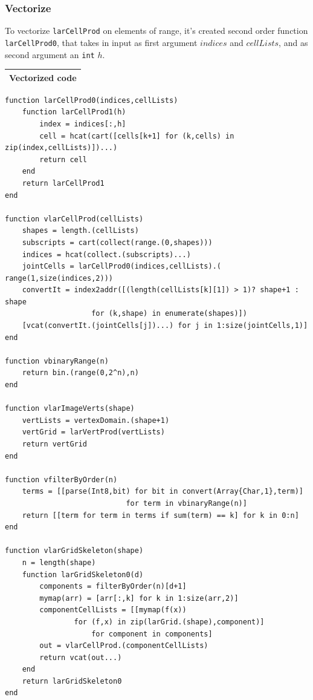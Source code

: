 \documentclass{article}
\begin{document}
\subsubsection{Vectorize}
To vectorize \texttt{larCellProd} on elements of range, it's created second order function \texttt{larCellProd0}, that takes in input as first argument $indices$ and $cellLists$, and as second argument an \texttt{int} $h$. 
\vspace{1ex}
\begin{flushleft} \small
\begin{center}
\begin{tabular}{|p{16cm}|}
\hline
\cellcolor[gray]{.9}Vectorized code\\
\hline
\end{tabular}
\end{center}
\vspace{2ex}
\begin{list}{}{} \item
   \begin{Verbatim}[tabsize=4]
function larCellProd0(indices,cellLists)
	function larCellProd1(h)
		index = indices[:,h]
		cell = hcat(cart([cells[k+1] for (k,cells) in zip(index,cellLists)])...)	
		return cell
	end
	return larCellProd1
end
	
function vlarCellProd(cellLists)
	shapes = length.(cellLists)
	subscripts = cart(collect(range.(0,shapes)))
	indices = hcat(collect.(subscripts)...)
	jointCells = larCellProd0(indices,cellLists).( range(1,size(indices,2)))
	convertIt = index2addr([(length(cellLists[k][1]) > 1)? shape+1 : shape 
					for (k,shape) in enumerate(shapes)])
	[vcat(convertIt.(jointCells[j])...) for j in 1:size(jointCells,1)]
end

function vbinaryRange(n)
	return bin.(range(0,2^n),n) 
end

function vlarImageVerts(shape)
	vertLists = vertexDomain.(shape+1) 
	vertGrid = larVertProd(vertLists)
	return vertGrid
end

function vfilterByOrder(n)
	terms = [[parse(Int8,bit) for bit in convert(Array{Char,1},term)] 
							for term in vbinaryRange(n)]
	return [[term for term in terms if sum(term) == k] for k in 0:n]
end

function vlarGridSkeleton(shape)
    n = length(shape)
    function larGridSkeleton0(d)
        components = filterByOrder(n)[d+1]
        mymap(arr) = [arr[:,k] for k in 1:size(arr,2)]
        componentCellLists = [[mymap(f(x)) 
				for (f,x) in zip(larGrid.(shape),component)]
					for component in components]
        out = vlarCellProd.(componentCellLists)
        return vcat(out...)
    end
    return larGridSkeleton0
end
   \end{Verbatim}
\end{list}



\end{flushleft}
\end{document}
